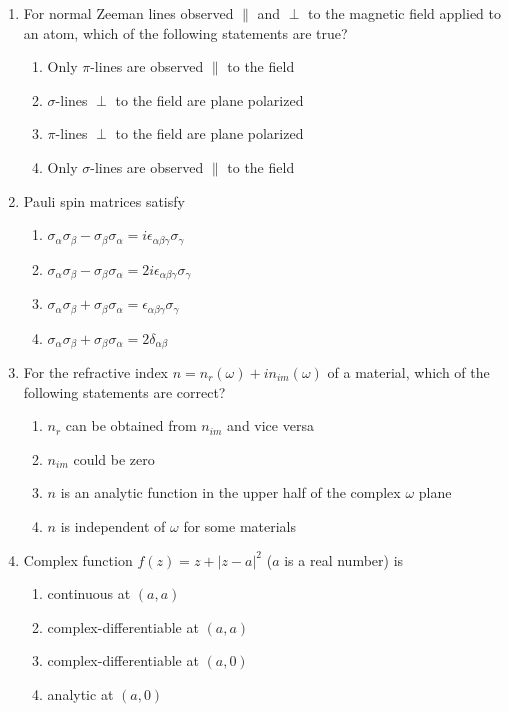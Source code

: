 \documentclass[journal,12pt,onecolumn]{IEEEtran}
\theoremstyle{remark}
\begin{document}
\begin{enumerate}
\item
For normal Zeeman lines observed $\|$ and $\perp$ to the magnetic field applied to an atom, which of the following statements are true?
\begin{enumerate}
    \item Only $\pi$-lines are observed $\|$ to the field
    \item $\sigma$-lines $\perp$ to the field are plane polarized
    \item $\pi$-lines $\perp$ to the field are plane polarized
    \item Only $\sigma$-lines are observed $\|$ to the field
\end{enumerate}


\item
Pauli spin matrices satisfy
\begin{enumerate}
    \item $\sigma_\alpha \sigma_\beta - \sigma_\beta \sigma_\alpha = i \epsilon_{\alpha\beta\gamma} \sigma_\gamma$
    \item $\sigma_\alpha \sigma_\beta - \sigma_\beta \sigma_\alpha = 2i \epsilon_{\alpha\beta\gamma} \sigma_\gamma$
    \item $\sigma_\alpha \sigma_\beta + \sigma_\beta \sigma_\alpha = \epsilon_{\alpha\beta\gamma} \sigma_\gamma$
    \item $\sigma_\alpha \sigma_\beta + \sigma_\beta \sigma_\alpha = 2\delta_{\alpha\beta}$
\end{enumerate}


\item
For the refractive index $n = n_r(\omega) + i n_{im}(\omega)$ of a material, which of the following statements are correct?
\begin{enumerate}
    \item $n_r$ can be obtained from $n_{im}$ and vice versa
    \item $n_{im}$ could be zero
    \item $n$ is an analytic function in the upper half of the complex $\omega$ plane
    \item $n$ is independent of $\omega$ for some materials
\end{enumerate}


\item
Complex function $f(z) = z + |z - a|^2$ ($a$ is a real number) is
\begin{enumerate}
    \item continuous at $(a, a)$
    \item complex-differentiable at $(a, a)$
    \item complex-differentiable at $(a, 0)$
    \item analytic at $(a, 0)$
\end{enumerate}



\end{enumerate}
\end{document}
